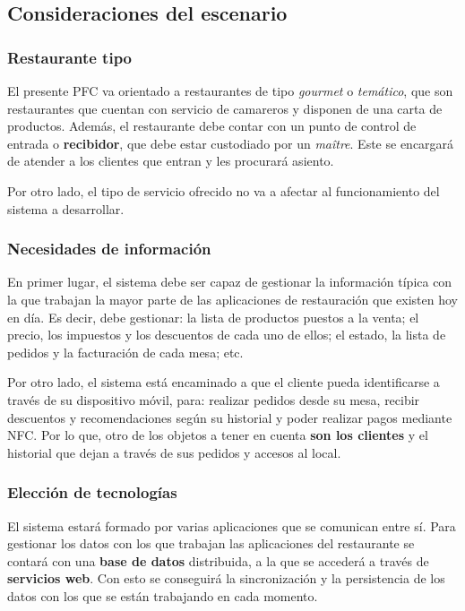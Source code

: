   \subsection{Consideraciones del escenario}
  \label{subsec:scenario}
    \subsubsection{Restaurante tipo}
  El presente \acs{PFC} va orientado a restaurantes de tipo
  \emph{gourmet} o \emph{temático}, que son restaurantes que cuentan con
  servicio de camareros y disponen de una carta de productos. Además, el
  restaurante debe contar con un punto de  control de entrada o
  \textbf{recibidor}, que debe estar custodiado por un \emph{maître}. Este se
  encargará de atender a los clientes que entran y les procurará asiento.

  Por otro lado, el tipo de servicio ofrecido no va a afectar al funcionamiento
  del sistema a desarrollar.

    \subsubsection{Necesidades de información}
  En primer lugar, el sistema debe ser capaz de gestionar la información
  típica con la que trabajan la mayor parte de las aplicaciones de
  restauración que existen hoy en día. Es decir, debe gestionar: la lista
  de productos puestos a la venta; el precio, los impuestos y los
  descuentos de cada uno de ellos; el estado, la lista de pedidos y la
  facturación de cada mesa; etc.

  Por otro lado, el sistema está encaminado a que el cliente pueda 
  identificarse a través de su dispositivo móvil, para: realizar
  pedidos desde su mesa, recibir descuentos y recomendaciones según su
  historial y poder realizar pagos mediante \acs{NFC}. Por lo que, otro de los
  objetos a tener en cuenta \textbf{son los clientes} y el historial que dejan
  a través de sus pedidos y accesos al local.

    \subsubsection{Elección de tecnologías}
  El sistema estará formado por varias aplicaciones que se comunican entre sí.
  Para gestionar los datos con los que trabajan las aplicaciones del
  restaurante se contará con una \textbf{base de datos} distribuida, a la que
  se accederá a través de \textbf{servicios web}. Con esto se conseguirá la
  sincronización y la persistencia de los datos con los que se están trabajando
  en cada momento.


